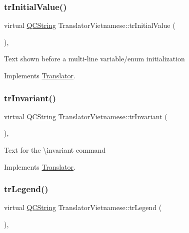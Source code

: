 \mbox{\label{class_translator_vietnamese_ae6838b55e7486e40218a033c02b8b284}} 
\subsubsection{\texorpdfstring{trInitialValue()}{trInitialValue()}}
{\footnotesize\ttfamily virtual \mbox{\hyperlink{class_q_c_string}{Q\+C\+String}} Translator\+Vietnamese\+::tr\+Initial\+Value (\begin{DoxyParamCaption}{ }\end{DoxyParamCaption})\hspace{0.3cm}{\ttfamily [inline]}, {\ttfamily [virtual]}}

Text shown before a multi-\/line variable/enum initialization 

Implements \mbox{\hyperlink{class_translator}{Translator}}.

\mbox{\label{class_translator_vietnamese_a222692fca3bc168b18f4f82a13220d50}} 
\subsubsection{\texorpdfstring{trInvariant()}{trInvariant()}}
{\footnotesize\ttfamily virtual \mbox{\hyperlink{class_q_c_string}{Q\+C\+String}} Translator\+Vietnamese\+::tr\+Invariant (\begin{DoxyParamCaption}{ }\end{DoxyParamCaption})\hspace{0.3cm}{\ttfamily [inline]}, {\ttfamily [virtual]}}

Text for the \textbackslash{}invariant command 

Implements \mbox{\hyperlink{class_translator}{Translator}}.

\mbox{\label{class_translator_vietnamese_a113a7f34cd042c5557386da4dc98ec39}} 
\subsubsection{\texorpdfstring{trLegend()}{trLegend()}}
{\footnotesize\ttfamily virtual \mbox{\hyperlink{class_q_c_string}{Q\+C\+String}} Translator\+Vietnamese\+::tr\+Legend (\begin{DoxyParamCaption}{ }\end{DoxyParamCaption})\hspace{0.3cm}{\ttfamily [inline]}, {\ttfamily [virtual]}}

